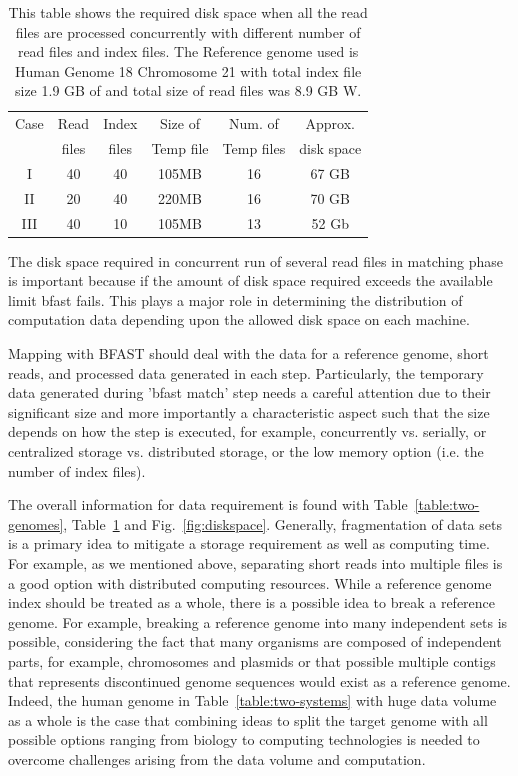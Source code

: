 \documentclass{acm_proc_article-sp}
\begin{document}
\begin{table}
 \begin{tabular}{|c|c|c|c|c|c|} 
 \hline 
Case &Read& Index& Size of&  Num. of & Approx.  \\
 &files &  files  & Temp file & Temp files & disk space\\
 \hline
I&40 & 40 &105MB & 16 &67 GB \\
II&20 & 40 & 220MB & 16 &70 GB \\
III&40 & 10 & 105MB & 13 &52 Gb \\ 
 \hline
 \end{tabular}
 \label{table:dynamic-diskspace} 
 \caption{This table shows the required disk space when all the read files
   are processed concurrently with different number of read files and
   index files. The Reference genome used is Human Genome 18
   Chromosome 21 with total index file size 1.9 GB of and total size of read files was 8.9 GB W.}
\end{table}

The disk space required in concurrent run of several read files in
matching phase is important because if the amount of disk space
required exceeds the available limit bfast fails. This plays a major
role in determining the distribution of computation data depending
upon the allowed disk space on each machine.


Mapping with BFAST should deal with the data for a reference genome, short reads, and processed 
data generated in each step.  Particularly, the temporary data generated during 'bfast match' step 
needs a careful attention due to their significant size and more importantly a characteristic aspect
 such that the size depends on how the step is executed, for example, concurrently vs. serially, 
 or centralized storage vs. distributed storage, or the low memory option (i.e. the number of index files).
   
The overall information for data requirement is found with Table~\ref{table:two-genomes}, 
Table~\ref{table:dynamic-diskspace} and Fig.~\ref{fig:diskspace}. Generally, fragmentation 
of data sets is a primary idea to mitigate a storage requirement as well as computing time.  
For example, as we mentioned above, separating short reads into multiple files is a good 
option with distributed computing resources.  While a reference genome index should be 
treated as a whole, there is a possible idea to break a reference genome.  For example, 
breaking a reference genome into many independent sets is possible, considering the fact 
that many organisms are composed of independent parts, for example, chromosomes and 
plasmids or that possible multiple contigs that represents discontinued genome sequences
 would exist as a reference genome.  Indeed, the human genome in Table~\ref{table:two-systems} 
 with huge data volume as a whole is the case that combining ideas to split the target genome 
 with all possible options ranging from biology to computing technologies is needed to
 overcome challenges arising from the data volume and computation.   
\end{document}
